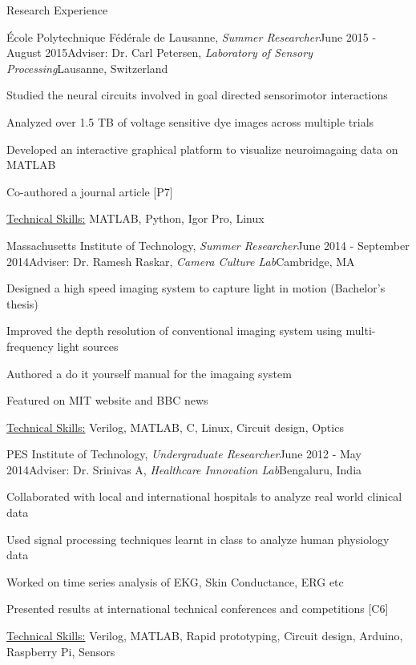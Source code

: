 \documentclass{resume}
\begin{document}
\begin{rSection}{Research Experience}
    \begin{rSubsection}{École Polytechnique Fédérale de Lausanne, \textit{Summer Researcher}}{June 2015 - August 2015}{Adviser: Dr. Carl Petersen, \textit{Laboratory of Sensory Processing}}{Lausanne, Switzerland}
\item Studied the neural circuits involved in goal directed sensorimotor interactions
\item Analyzed over 1.5 TB of voltage sensitive dye images across multiple trials
\item Developed an interactive graphical platform to visualize neuroimagaing data on MATLAB
\item Co-authored a journal article [P7]
\item \uline{Technical Skills:} MATLAB, Python, Igor Pro, Linux
    \end{rSubsection}
\newpage
    \begin{rSubsection}{Massachusetts Institute of Technology, \textit{Summer Researcher}}{June 2014 - September 2014}{Adviser: Dr. Ramesh Raskar, \textit{Camera Culture Lab}}{Cambridge, MA}
\item Designed a high speed imaging system to capture light in motion (Bachelor's thesis)
\item Improved the depth resolution of conventional imaging system using multi-frequency light sources
\item Authored a do it yourself manual for the imagaing system
\item Featured on MIT website and BBC news
\item \uline{Technical Skills:} Verilog, MATLAB, C, Linux, Circuit design, Optics
    \end{rSubsection}
    
 \begin{rSubsection}{PES Institute of Technology, \textit{Undergraduate Researcher}}{June 2012 - May 2014}{Adviser: Dr. Srinivas A, \textit{Healthcare Innovation Lab}}{Bengaluru, India}
\item Collaborated with local and international hospitals to analyze real world clinical data
\item Used signal processing techniques learnt in class to analyze human physiology data
\item Worked on time series analysis of EKG, Skin Conductance, ERG etc
\item Presented results at international technical conferences and competitions [C6]
\item \uline{Technical Skills:} Verilog, MATLAB, Rapid prototyping, Circuit design, Arduino, Raspberry Pi, Sensors
 \end{rSubsection}
  \end{rSection}
\end{document}
